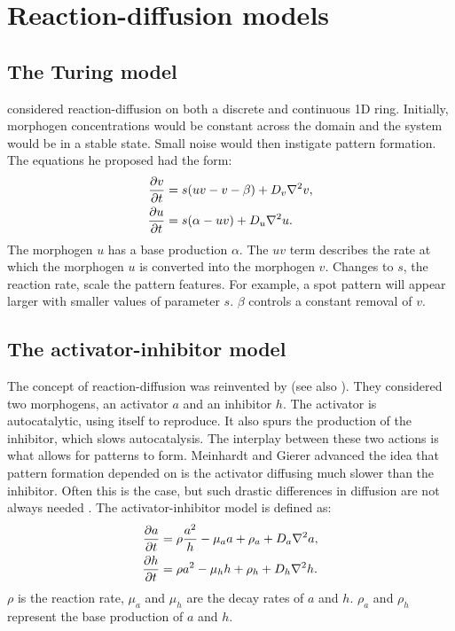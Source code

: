 \section{Reaction-diffusion models}
\subsection{The Turing model}
\citet{turing1952} considered reaction-diffusion on both a discrete and continuous 1D ring. Initially, morphogen concentrations would be constant across the domain and the system would be in a stable state. Small noise would then instigate pattern formation. The equations he proposed had the form:
	\begin{equation}
	\begin{aligned} \label{eq:turingRD}
			\frac{\partial v}{\partial t} &= s(uv-v-\beta) + D_v \nabla^2 v,\\
			\frac{\partial u}{\partial t} &= s(\alpha-uv) + D_u \nabla^2 u.
	\end{aligned}
	\end{equation}
The morphogen $u$ has a base production $\alpha$. The $uv$ term describes the rate at which the morphogen $u$ is converted into the morphogen $v$. Changes to $s$, the reaction rate, scale the pattern features. For example, a spot pattern will appear larger with smaller values of parameter $s$. $\beta$ controls a constant removal of $v$.

\subsection{The activator-inhibitor model}
The concept of reaction-diffusion was reinvented by \citet{gierer1972} (see also \citep{meinhardt1982}). They considered two morphogens, an activator $a$ and an inhibitor $h$. The activator is autocatalytic, using itself to reproduce. It also spurs the production of the inhibitor, which slows autocatalysis. The interplay between these two actions is what allows for patterns to form. Meinhardt and Gierer advanced the idea that pattern formation depended on is the activator diffusing much slower than the inhibitor. Often this is the case, but such drastic differences in diffusion are not always needed \citep{gray1984, marcon2016}. The activator-inhibitor model is defined as:
	\begin{equation}
	\begin{aligned} \label{eq:activatorInhibitorRD}
			\frac{\partial a}{\partial t} &= \rho \frac{a^2}{h} - \mu_a a + \rho_a + D_a \nabla^2 a,\\
			\frac{\partial h}{\partial t} &= \rho a^2 - \mu_h h  + \rho_h + D_h \nabla^2 h.
	\end{aligned}
	\end{equation}
$\rho$ is the reaction rate, $\mu_a$ and $\mu_h$ are the decay rates of $a$ and $h$. $\rho_a$ and $\rho_h$ represent the base production of $a$ and $h$. 

